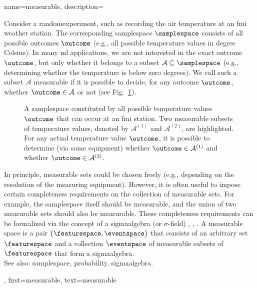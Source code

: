 {name={measurable}, 
	description={Consider a \gls{randomexperiment}, such as recording 
	the air temperature at an \gls{fmi} weather station. The corresponding \gls{samplespace} 
	$\samplespace$ consists of all possible outcomes $\outcome$ (e.g., 
		all possible temperature values in degree Celsius). In many \gls{ml} 
		applications, we are not interested in the exact outcome $\outcome$, but only 
		whether it belongs to a subset $\mathcal{A} \subseteq \samplespace$ 
		(e.g., determining whether the temperature is below zero degrees). 
		We call such a subset $\mathcal{A}$ measurable if it is possible to 
		decide, for any outcome $\outcome$, whether $\outcome \in \mathcal{A}$ 
		or not (see Fig.\ \ref{fig_measurable_dict}). \\
		\begin{figure}[H]
		\begin{center}
			\vspace*{10mm}
			\end{center}
			\caption{A \gls{samplespace} constituted by all possible temperature values $\outcome$ 
			that can occur at an \gls{fmi} station. Two measurable subsets of temperature 
			values, denoted by $\mathcal{A}^{(1)}$ and $\mathcal{A}^{(2)}$, are highlighted. For any 
			actual temperature value $\outcome$, it is possible to determine (via some equipment) 
			whether $\outcome \in \mathcal{A}^{(1)}$ and whether $\outcome \in \mathcal{A}^{(2)}$. \label{fig_measurable_dict}} 
		\end{figure}
		In principle, measurable sets could be chosen freely (e.g., depending on the resolution of the 
		measuring equipment). However, it is often useful to impose certain completeness requirements 
		on the collection of measurable sets. For example, the \gls{samplespace} itself should be 
		measurable, and the union of two measurable sets should also be measurable. These completeness 
		requirements can be formalized via the concept of a \gls{sigmaalgebra} (or $\sigma$-field) 
		\cite{RudinBook}, \cite{BillingsleyProbMeasure}, \cite{durrett2010probability}. 
		A measurable space is a pair $\big(\featurespace,\eventspace\big)$ that consists of an arbitrary 
		set $\featurespace$ and a collection $\eventspace$ of measurable subsets of $\featurespace$ 
		that form a \gls{sigmaalgebra}. 
		\\
		See also: \gls{samplespace}, \gls{probability}, \gls{sigmaalgebra}.},
	first={measurable},
	text={measurable} 
}

